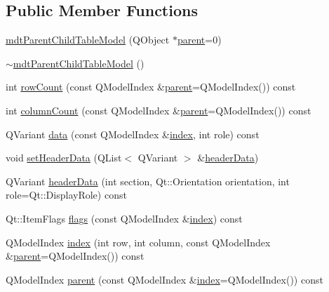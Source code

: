 \subsection*{Public Member Functions}
\begin{DoxyCompactItemize}
\item 
\hyperlink{classmdt_parent_child_table_model_a6a02b85f8663bd913b23380381287c0b}{mdt\-Parent\-Child\-Table\-Model} (Q\-Object $\ast$\hyperlink{classmdt_parent_child_table_model_aa4827005e9009f1b0fddf4ae962d6031}{parent}=0)
\item 
\hyperlink{classmdt_parent_child_table_model_abe9a228d3890a3228feeadc14217650e}{$\sim$mdt\-Parent\-Child\-Table\-Model} ()
\item 
int \hyperlink{classmdt_parent_child_table_model_a00ede0aa95a181c04aafffa56bd8f470}{row\-Count} (const Q\-Model\-Index \&\hyperlink{classmdt_parent_child_table_model_aa4827005e9009f1b0fddf4ae962d6031}{parent}=Q\-Model\-Index()) const 
\item 
int \hyperlink{classmdt_parent_child_table_model_a6d1941603fde6be4942439f22616249e}{column\-Count} (const Q\-Model\-Index \&\hyperlink{classmdt_parent_child_table_model_aa4827005e9009f1b0fddf4ae962d6031}{parent}=Q\-Model\-Index()) const 
\item 
Q\-Variant \hyperlink{classmdt_parent_child_table_model_aea9349919cafde88c33aa6ff8c68f4ff}{data} (const Q\-Model\-Index \&\hyperlink{classmdt_parent_child_table_model_abd2bd46910ca92c7b92ff24593bfa4d1}{index}, int role) const 
\item 
void \hyperlink{classmdt_parent_child_table_model_a639b9f817d3c67e913c1e758ceb15f12}{set\-Header\-Data} (Q\-List$<$ Q\-Variant $>$ \&\hyperlink{classmdt_parent_child_table_model_ac0fe230365b4685729886eb89c3bee2d}{header\-Data})
\item 
Q\-Variant \hyperlink{classmdt_parent_child_table_model_ac0fe230365b4685729886eb89c3bee2d}{header\-Data} (int section, Qt\-::\-Orientation orientation, int role=Qt\-::\-Display\-Role) const 
\item 
Qt\-::\-Item\-Flags \hyperlink{classmdt_parent_child_table_model_ad937c815fb4d3afdd7bf6a222e216b2c}{flags} (const Q\-Model\-Index \&\hyperlink{classmdt_parent_child_table_model_abd2bd46910ca92c7b92ff24593bfa4d1}{index}) const 
\item 
Q\-Model\-Index \hyperlink{classmdt_parent_child_table_model_abd2bd46910ca92c7b92ff24593bfa4d1}{index} (int row, int column, const Q\-Model\-Index \&\hyperlink{classmdt_parent_child_table_model_aa4827005e9009f1b0fddf4ae962d6031}{parent}=Q\-Model\-Index()) const 
\item 
Q\-Model\-Index \hyperlink{classmdt_parent_child_table_model_aa4827005e9009f1b0fddf4ae962d6031}{parent} (const Q\-Model\-Index \&\hyperlink{classmdt_parent_child_table_model_abd2bd46910ca92c7b92ff24593bfa4d1}{index}=Q\-Model\-Index()) const 
\end{DoxyCompactItemize}


